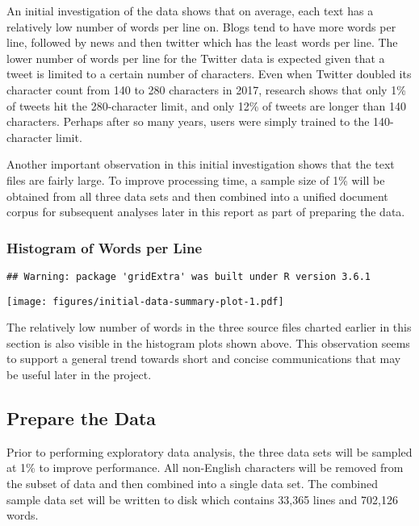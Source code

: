 \documentclass[]{article}
\begin{document}
An initial investigation of the data shows that on average, each text
has a relatively low number of words per line on. Blogs tend to have
more words per line, followed by news and then twitter which has the
least words per line. The lower number of words per line for the Twitter
data is expected given that a tweet is limited to a certain number of
characters. Even when Twitter doubled its character count from 140 to
280 characters in 2017, research shows that only 1\% of tweets hit the
280-character limit, and only 12\% of tweets are longer than 140
characters. Perhaps after so many years, users were simply trained to
the 140-character limit.

Another important observation in this initial investigation shows that
the text files are fairly large. To improve processing time, a sample
size of 1\% will be obtained from all three data sets and then combined
into a unified document corpus for subsequent analyses later in this
report as part of preparing the data.

\hypertarget{histogram-of-words-per-line}{%
\subsubsection{Histogram of Words per
Line}\label{histogram-of-words-per-line}}

\begin{verbatim}
## Warning: package 'gridExtra' was built under R version 3.6.1
\end{verbatim}

\texttt{[image: figures/initial-data-summary-plot-1.pdf]}

The relatively low number of words in the three source files charted
earlier in this section is also visible in the histogram plots shown
above. This observation seems to support a general trend towards short
and concise communications that may be useful later in the project.

\hypertarget{prepare-the-data}{%
\subsection{Prepare the Data}\label{prepare-the-data}}

Prior to performing exploratory data analysis, the three data sets will
be sampled at 1\% to improve performance. All non-English characters
will be removed from the subset of data and then combined into a single
data set. The combined sample data set will be written to disk which
contains 33,365 lines and 702,126 words.
\end{document}
